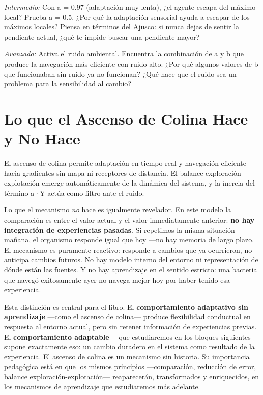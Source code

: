 \documentclass[
  letterpaper,
  DIV=11,
  numbers=noendperiod]{scrreprt}
\begin{document}
\emph{Intermedio:} Con a = 0.97 (adaptación muy lenta), ¿el agente
escapa del máximo local? Prueba a = 0.5. ¿Por qué la adaptación
sensorial ayuda a escapar de los máximos locales? Piensa en términos del
Ajusco: si nunca dejas de sentir la pendiente actual, ¿qué te impide
buscar una pendiente mayor?

\emph{Avanzado:} Activa el ruido ambiental. Encuentra la combinación de
a y b que produce la navegación más eficiente con ruido alto. ¿Por qué
algunos valores de b que funcionaban sin ruido ya no funcionan? ¿Qué
hace que el ruido sea un problema para la sensibilidad al cambio?

\section{Lo que el Ascenso de Colina Hace y No
Hace}\label{lo-que-el-ascenso-de-colina-hace-y-no-hace}

El ascenso de colina permite adaptación en tiempo real y navegación
eficiente hacia gradientes sin mapa ni receptores de distancia. El
balance exploración-explotación emerge automáticamente de la dinámica
del sistema, y la inercia del término a·Y actúa como filtro ante el
ruido.

Lo que el mecanismo \emph{no} hace es igualmente revelador. En este
modelo la comparación es entre el valor actual y el valor inmediatamente
anterior: \textbf{no hay integración de experiencias pasadas}. Si
repetimos la misma situación mañana, el organismo responde igual que hoy
---no hay memoria de largo plazo. El mecanismo es puramente reactivo:
responde a cambios que ya ocurrieron, no anticipa cambios futuros. No
hay modelo interno del entorno ni representación de dónde están las
fuentes. Y no hay aprendizaje en el sentido estricto: una bacteria que
navegó exitosamente ayer no navega mejor hoy por haber tenido esa
experiencia.

Esta distinción es central para el libro. El \textbf{comportamiento
adaptativo sin aprendizaje} ---como el ascenso de colina--- produce
flexibilidad conductual en respuesta al entorno actual, pero sin retener
información de experiencias previas. El \textbf{comportamiento
adaptable} ---que estudiaremos en los bloques siguientes--- supone
exactamente eso: un cambio duradero en el sistema como resultado de la
experiencia. El ascenso de colina es un mecanismo sin historia. Su
importancia pedagógica está en que los mismos principios ---comparación,
reducción de error, balance exploración-explotación--- reaparecerán,
transformados y enriquecidos, en los mecanismos de aprendizaje que
estudiaremos más adelante.
\end{document}
